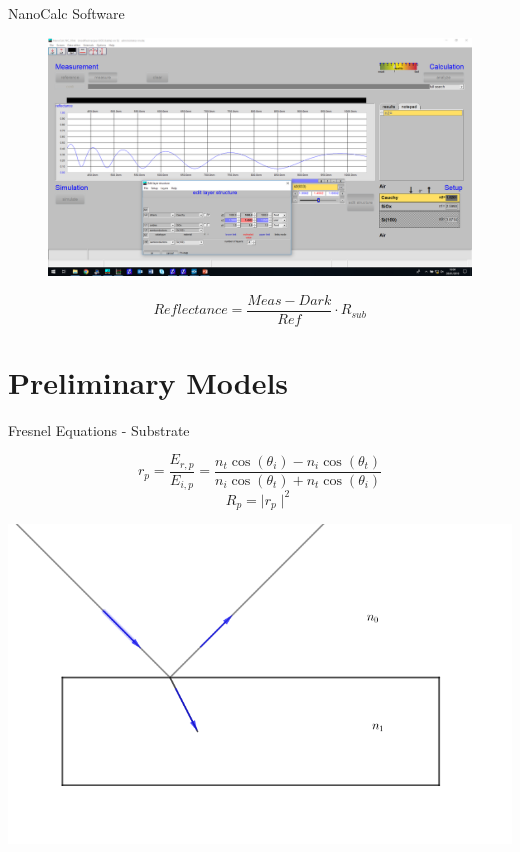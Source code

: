 \documentclass[10pt]{beamer}
\begin{document}
	\begin{frame}{NanoCalc Software}
	
	\begin{figure}
	\includegraphics[width=\textwidth]{nanocalc.png}
	\end{figure}
	
	\begin{equation*}
	Reflectance = \frac{Meas-Dark}{Ref} \cdot R_{sub}
	\end{equation*}
	
	\end{frame}
	
	\section{Preliminary Models}
	
	\begin{frame}{Fresnel Equations - Substrate}
	
	\begin{minipage}{0.47\textwidth}
	\begin{equation*}
	r_p = \frac{E_{r,p}}{E_{i,p}} = \frac{n_t\cos(\theta_i)-n_i\cos(\theta_t)}{n_i\cos(\theta_t)+n_t\cos(\theta_i)}
	\end{equation*}
	\begin{equation*}
	R_p = \mid r_p \mid ^2 
	\end{equation*}
	\end{minipage}
	\begin{minipage}{0.5\textwidth}
	\includegraphics[scale=0.2]{subrefl.png}
	\end{minipage}
	\end{frame}
	
\end{document}
